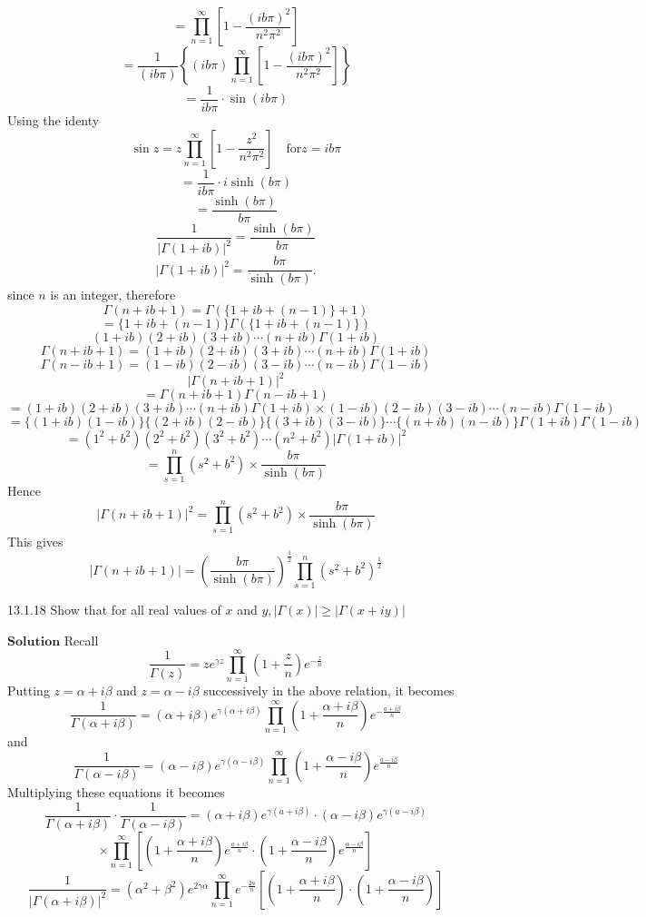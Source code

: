 $$
=\prod_{n=1}^{\infty}\left[1-\frac{(i b \pi)^{2}}{n^{2} \pi^{2}}\right]
$$
$$
=\frac{1}{(i b \pi)}\left\{(i b \pi) \prod_{n=1}^{\infty}\left[1-\frac{(i b \pi)^{2}}{n^{2} \pi^{2}}\right]\right\}
$$
$$
=\frac{1}{i b \pi} \cdot \sin (i b \pi)
$$
Using the identy
$$
\sin z=z \prod_{n=1}^{\infty}\left[1-\frac{z^{2}}{n^{2} \pi^{2}}\right] \quad \text{for} z=ib\pi
$$
$$=\frac{1}{i b \pi} \cdot i \sinh (b \pi)$$
$$=\frac{\sinh (b \pi)}{b \pi}$$
$$\frac{1}{|\Gamma(1+i b)|^{2}}=\frac{\sinh (b \pi)}{b \pi}$$
$$|\Gamma(1+i b)|^{2}=\frac{b \pi}{\sinh (b \pi)} .$$
since $n$ is an integer, therefore
$$\Gamma(n+i b+1)=\Gamma(\{1+i b+(n-1)\}+1)$$
$$=\{1+i b+(n-1)\} \Gamma(\{1+i b+(n-1)\})$$
$$
(1+i b)(2+i b)(3+i b) \cdots(n+i b) \Gamma(1+i b)
$$
$$
\Gamma(n+i b+1)=(1+i b)(2+i b)(3+i b) \cdots(n+i b) \Gamma(1+i b)
$$
$$
\Gamma(n-i b+1)=(1-i b)(2-i b)(3-i b) \cdots(n-i b) \Gamma(1-i b)
$$
$$|\Gamma(n+i b+1)|^{2}$$
$$=\Gamma(n+i b+1) \Gamma(n-i b+1)$$
$$=(1+i b)(2+i b)(3+i b) \cdots(n+i b) \Gamma(1+i b) \times(1-i b)(2-i b)(3-i b) \cdots(n-i b) \Gamma(1-i b)$$
$$=\{(1+i b)(1-i b)\}\{(2+i b)(2-i b)\}\{(3+i b)(3-i b)\} \cdots\{(n+i b)(n-i b)\} \Gamma(1+i b) \Gamma(1-i b)$$
$$=\left(1^{2}+b^{2}\right)\left(2^{2}+b^{2}\right)\left(3^{2}+b^{2}\right) \cdots\left(n^{2}+b^{2}\right)|\Gamma(1+i b)|^{2}$$
$$
=\prod_{s=1}^{n}\left(s^{2}+b^{2}\right) \times \frac{b \pi}{\sinh (b \pi)}
$$
Hence 
$$|\Gamma(n+i b+1)|^{2}=\prod_{s=1}^{n}\left(s^{2}+b^{2}\right) \times \frac{b \pi}{\sinh (b \pi)}$$
This gives 
$$|\Gamma(n+i b+1)|=\left(\frac{b \pi}{\sinh (b \pi)}\right)^{\frac{1}{2}} \prod_{s=1}^{n}\left(s^{2}+b^{2}\right)^{\frac{1}{2}} $$



\begin{mybox}{13.1.18}
Show that for all real values of $x$ and $y,|\Gamma(x)| \geq|\Gamma(x+i y)|$
\end{mybox}


$\boxed{\textbf{Solution}}$ Recall 
$$
\frac{1}{\Gamma(z)}=z e^{\gamma z} \prod_{n=1}^{\infty}\left(1+\frac{z}{n}\right) e^{-\frac{z}{n}}
$$
Putting $z=\alpha+i \beta$ and $z=\alpha-i \beta$ successively in the above relation, it becomes
$$
\frac{1}{\Gamma(\alpha+i \beta)}=(\alpha+i \beta) e^{\gamma(\alpha+i \beta)} \prod_{n=1}^{\infty}\left(1+\frac{\alpha+i \beta}{n}\right) e^{-\frac{a+i \beta}{n}}
$$
and 
$$
\frac{1}{\Gamma(\alpha-i \beta)}=(\alpha-i \beta) e^{\gamma(\alpha-i \beta)} \prod_{n=1}^{\infty}\left(1+\frac{\alpha-i \beta}{n}\right) e^{\frac{a-i \beta}{n}}
$$
Multiplying these equations it becomes
$$
\frac{1}{\Gamma(\alpha+i \beta)} \cdot \frac{1}{\Gamma(\alpha-i \beta)}=(\alpha+i \beta) e^{\gamma(a+i \beta)} \cdot(\alpha-i \beta) e^{\gamma(a-i \beta)}$$
$$\times \prod_{n=1}^{\infty}\left[\left(1+\frac{\alpha+i \beta}{n}\right) e^{\frac{a+i \beta}{n}} \cdot\left(1+\frac{\alpha-i \beta}{n}\right) e^{\frac{\alpha-i \beta}{n}}\right]
$$
$$
\frac{1}{|\Gamma(\alpha+i \beta)|^{2}}=\left(\alpha^{2}+\beta^{2}\right) e^{2\gamma \alpha} \prod_{n=1}^{\infty} e^{-\frac{2 a}{n}}\left[\left(1+\frac{\alpha+i \beta}{n}\right) \cdot\left(1+\frac{\alpha-i \beta}{n}\right)\right]
$$


